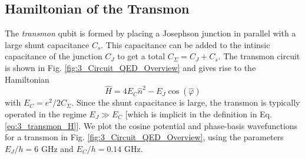 \subsection{Hamiltonian of the Transmon}

The \textit{transmon} qubit is formed by placing a Josephson junction in parallel with a large shunt capacitance $C_s$. This capacitance can be added to the intinsic capacitance of the junction $C_J$ to get a total $C_\Sigma = C_J + C_s$. The transmon circuit is shown in Fig. \ref{fig:3_Circuit_QED_Overview} and gives rise to the Hamiltonian
\begin{equation}
    \hat{H} = 4E_C\hat{n}^2 - E_J\cos(\hat{\varphi})
    \label{eq:3_transmon_H}
\end{equation}
with $E_C = e^2/2C_\Sigma$. Since the shunt capacitance is large, the transmon is typically operated in the regime $E_J \gg E_C$ [which is implicit in the definition in Eq. \eqref{eq:3_transmon_H}]. We plot the cosine potential and phase-basis wavefunctions for a transmon in Fig. \ref{fig:3_Circuit_QED_Overview}, using the parameters $E_J/h = 6$ GHz and $E_C/h = 0.14$ GHz. 

